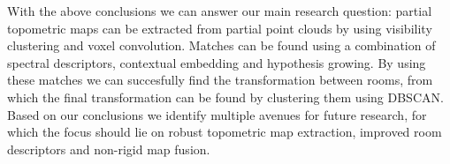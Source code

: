 With the above conclusions we can answer our main research question: partial topometric maps can be extracted from partial point clouds by using visibility clustering and voxel convolution. Matches can be found using a combination of spectral descriptors, contextual embedding and hypothesis growing. By using these matches we can succesfully find the transformation between rooms, from which the final transformation can be found by clustering them using DBSCAN. Based on our conclusions we identify multiple avenues for future research, for which the focus should lie on robust topometric map extraction, improved room descriptors and non-rigid map fusion.